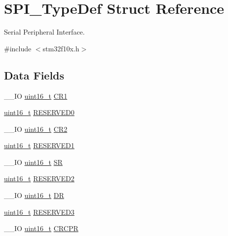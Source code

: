 \hypertarget{struct_s_p_i___type_def}{\section{S\-P\-I\-\_\-\-Type\-Def Struct Reference}
\label{struct_s_p_i___type_def}
}


Serial Peripheral Interface.  




{\ttfamily \#include $<$stm32f10x.\-h$>$}

\subsection*{Data Fields}
\begin{DoxyCompactItemize}
\item 
\-\_\-\-\_\-\-I\-O \hyperlink{stdint_8h_a273cf69d639a59973b6019625df33e30}{uint16\-\_\-t} \hyperlink{struct_s_p_i___type_def_a1e398155ddd013fcdd41309b4bd0bd5f}{C\-R1}
\item 
\hyperlink{stdint_8h_a273cf69d639a59973b6019625df33e30}{uint16\-\_\-t} \hyperlink{struct_s_p_i___type_def_a7f16c40933b8a713085436be72d30a46}{R\-E\-S\-E\-R\-V\-E\-D0}
\item 
\-\_\-\-\_\-\-I\-O \hyperlink{stdint_8h_a273cf69d639a59973b6019625df33e30}{uint16\-\_\-t} \hyperlink{struct_s_p_i___type_def_ac891e34644b8dc27bacc906cfd18b235}{C\-R2}
\item 
\hyperlink{stdint_8h_a273cf69d639a59973b6019625df33e30}{uint16\-\_\-t} \hyperlink{struct_s_p_i___type_def_a1b7a800c0f56532a431b19cf868e4102}{R\-E\-S\-E\-R\-V\-E\-D1}
\item 
\-\_\-\-\_\-\-I\-O \hyperlink{stdint_8h_a273cf69d639a59973b6019625df33e30}{uint16\-\_\-t} \hyperlink{struct_s_p_i___type_def_a017d7d54a7bf1925facea6b5e02fec83}{S\-R}
\item 
\hyperlink{stdint_8h_a273cf69d639a59973b6019625df33e30}{uint16\-\_\-t} \hyperlink{struct_s_p_i___type_def_a09ce56649bb5477e2fcf3e92bca8f735}{R\-E\-S\-E\-R\-V\-E\-D2}
\item 
\-\_\-\-\_\-\-I\-O \hyperlink{stdint_8h_a273cf69d639a59973b6019625df33e30}{uint16\-\_\-t} \hyperlink{struct_s_p_i___type_def_ae192c943732b6ab5e5611e860cc05544}{D\-R}
\item 
\hyperlink{stdint_8h_a273cf69d639a59973b6019625df33e30}{uint16\-\_\-t} \hyperlink{struct_s_p_i___type_def_aeb1d1d561f1d51232369197fa7acb53a}{R\-E\-S\-E\-R\-V\-E\-D3}
\item 
\-\_\-\-\_\-\-I\-O \hyperlink{stdint_8h_a273cf69d639a59973b6019625df33e30}{uint16\-\_\-t} \hyperlink{struct_s_p_i___type_def_a353c64e49ec9ae93b950668941f41175}{C\-R\-C\-P\-R}

\end{DoxyCompactItemize}
